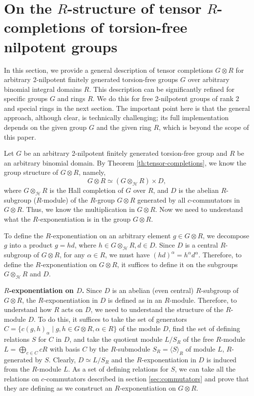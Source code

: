 \documentclass[11pt]{article}
\theoremstyle{definition}
\begin{document}



\section{On the \texorpdfstring{$R$}{}-structure of tensor \texorpdfstring{$R$}{}-completions of torsion-free nilpotent groups}
\label{sec:6}

In this section, we provide a general description of tensor completions $G\otimes R$ for arbitrary 2-nilpotent finitely generated torsion-free groups $G$ over arbitrary binomial integral domains $R$. This description can be significantly refined for specific groups $G$ and rings $R$. We do this for free 2-nilpotent groups of rank 2 and special rings in the next section. The important point here is that the general approach, although clear, is technically challenging; its full implementation depends on the given group $G$ and the given ring $R$, which is beyond the scope of this paper.




Let $G$ be an arbitrary 2-nilpotent finitely generated torsion-free group and $R$ be an arbitrary binomial domain. By Theorem \ref{th:tensor-completions}, we know the group structure of $G\otimes R$, namely,
$$
G\otimes R \simeq (G\otimes_{\mathcal{H}} R) \times D,
$$
where $G\otimes_{\mathcal{H}} R$ is the Hall completion of $G$ over $R$, and $D$ is the abelian $R$-subgroup ($R$-module) of the $R$-group $G\otimes R$ generated by all $c$-commutators in $G\otimes R$. Thus, we know the multiplication in $G\otimes R$. Now we need to understand what the $R$-exponentiation is in the group $G\otimes R$.

To define the $R$-exponentiation on an arbitrary element $g \in G\otimes R$, we decompose $g$ into a product $g = h d$, where $h \in G\otimes_{\mathcal{H}} R, d \in D$. Since $D$ is a central $R$-subgroup of $G\otimes R$, for any $\alpha \in R$, we must have $(hd)^\alpha = h^\alpha d^\alpha$. Therefore, to define the $R$-exponentiation on $G\otimes R$, it suffices to define it on the subgroups $G\otimes_{\mathcal{H}} R$ and $D$.

\medskip
\noindent
{\bf $R$-exponentiation on $D$.} Since $D$ is an abelian (even central) $R$-subgroup of $G\otimes R$, the $R$-exponentiation in $D$ is defined as in an $R$-module. Therefore, to understand how $R$ acts on $D$, we need to understand the structure of the $R$-module $D$. To do this, it suffices to take the set of generators $C= \{c(g,h)_\alpha \mid g, h \in G\otimes R, \alpha \in R\}$ of the module $D$, find the set of defining relations $S$ for $C$ in $D$, and take the quotient module $L/S_R$ of the free $R$-module $L = \bigoplus\limits_{c \in C} cR$ with basis $C$ by the $R$-submodule $S_R = \langle S\rangle_R$ of module $L$, $R$-generated by $S$. Clearly, $D \simeq L/S_R$ and the $R$-exponentiation in $D$ is induced from the $R$-module $L$. As a set of defining relations for $S$, we can take all the relations on $c$-commutators described in section \ref{sec:commutators} and prove that they are defining as we construct an $R$-exponentiation on $G \otimes R$.
\end{document}
